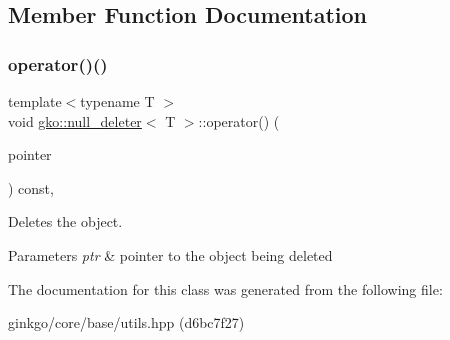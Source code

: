 \subsection{Member Function Documentation}
\mbox{\label{classgko_1_1null__deleter_a09fc153e500a30edaa572f2c6cb674ab}} 
\subsubsection{\texorpdfstring{operator()()}{operator()()}}
{\footnotesize\ttfamily template$<$typename T $>$ \\
void \hyperlink{classgko_1_1null__deleter}{gko\+::null\+\_\+deleter}$<$ T $>$\+::operator() (\begin{DoxyParamCaption}\item[{pointer}]{ }\end{DoxyParamCaption}) const\hspace{0.3cm}{\ttfamily [inline]}, {\ttfamily [noexcept]}}



Deletes the object. 


\begin{DoxyParams}{Parameters}
{\em ptr} & pointer to the object being deleted \\
\hline
\end{DoxyParams}


The documentation for this class was generated from the following file\+:\begin{DoxyCompactItemize}
\item 
ginkgo/core/base/utils.\+hpp (d6bc7f27)\end{DoxyCompactItemize}
